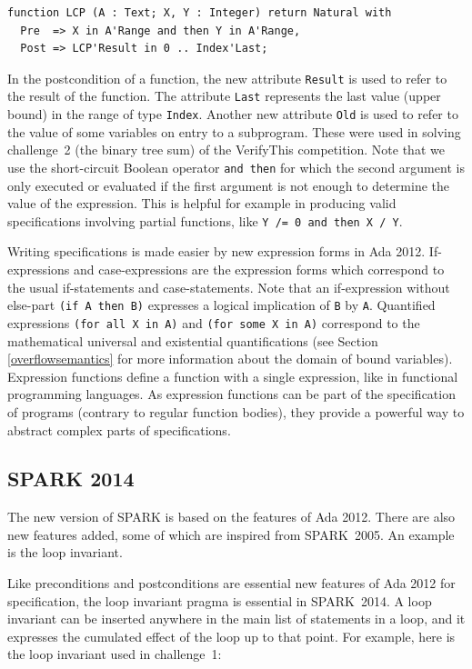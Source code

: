 \documentclass[sttt,final]{svjour}
\newcommand{\oldspark}{SPARK~2005\xspace}
\newcommand{\newspark}{SPARK~2014\xspace}
\begin{document}
\begin{lstlisting}
function LCP (A : Text; X, Y : Integer) return Natural with
  Pre  => X in A'Range and then Y in A'Range,
  Post => LCP'Result in 0 .. Index'Last;
\end{lstlisting}

In the postcondition of a function, the new attribute \verb|Result| is
used to refer to the result of the function. The attribute \verb|Last|
represents the last value (upper bound) in the range of type
\verb|Index|. Another new attribute \verb|Old| is used to refer to the
value of some variables on entry to a subprogram. These were used
in solving challenge~2 (the binary tree sum) of the VerifyThis
competition. Note that we use the short-circuit Boolean operator
\verb|and then| for which the second argument is only executed or
evaluated if the first argument is not enough to determine the value
of the expression. This is helpful for example in producing valid
specifications involving partial functions, like
\verb|Y /= 0 and then X / Y|.

Writing specifications is made easier by new expression
forms in Ada 2012. If-expressions and case-expressions are the
expression forms which correspond to the usual if-statements and
case-statements. Note that an if-expression without else-part
\verb|(if A then B)| expresses a logical implication of \verb|B| by
\verb|A|. Quantified expressions \verb|(for all X in A)| and
\verb|(for some X in A)| correspond to the mathematical universal and
existential quantifications (see Section \ref{overflowsemantics} for
more information about the domain of bound variables). Expression
functions define a function with a single expression, like in
functional programming languages. As expression functions can be part
of the specification of programs (contrary to regular function
bodies), they provide a powerful way to abstract complex parts of
specifications.

\subsection{SPARK 2014}

The new version of SPARK is based on the features of Ada 2012. There
are also new features added, some of which are inspired from
\oldspark. An example is the loop invariant.

Like preconditions and postconditions are essential new features of
Ada 2012 for specification, the loop invariant pragma is essential in
\newspark. A loop invariant can be inserted anywhere in the main list
of statements in a loop, and it expresses the cumulated effect of the
loop up to that point. For example, here is the loop invariant used in
challenge~1:
\end{document}
